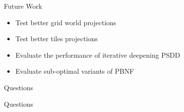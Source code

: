 \documentclass[style=unh]{powerdot}
\begin{document}

\begin{slide}{Future Work}
  \begin{itemize}
  \item Test better grid world projections
  \item Test better tiles projections
  \item Evaluate the performance of iterative deepening PSDD
  \item Evaluate sub-optimal variants of PBNF
  \end{itemize}
\end{slide}


\begin{slide}{Questions}
\end{slide}{Questions}

\end{document}

